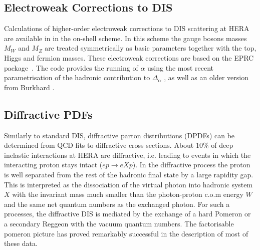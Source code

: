 \subsection{Electroweak Corrections to DIS}
Calculations of higher-order electroweak corrections to DIS scattering at 
HERA are available in \fitter in the on-shell scheme. In this scheme the
gauge bosons masses $M_W$ and 
$M_Z$ are treated symmetrically as basic parameters together with the top, 
Higgs and fermion masses.
These electroweak corrections 
are based on the EPRC package~\cite{SpiesbergerPrivComm}.
The code provides the running of $\alpha$ using the most recent parametrisation
of the hadronic contribution to $\Delta_\alpha$ \cite{Jegerlehner}, as well as 
an older version from Burkhard \cite{Burkhard}.



\subsection{Diffractive PDFs}

\newcommand{\asotp}{\ensuremath{\frac{\alpha_{\rm s}}{2\pi}}}
\newcommand{\Sgl}[1]{\ensuremath{\tilde f_{#1+}}}
\newcommand{\Pom}{{I\!P}}
\newcommand{\Reg}{{I\!R}}
\newcommand{\xpom}{$x_{I\!P}$}


Similarly to standard DIS, diffractive parton distributions (DPDFs) 
can be determined from QCD fits to diffractive cross sections.
About 10\% of deep inelastic interactions at HERA are diffractive, i.e. leading to
events in which the interacting proton stays intact ($ep\to eXp$). 
In the diffractive process the proton is well separated from the 
rest of the hadronic final state by a large rapidity gap.  
This is interpreted as the dissociation of the virtual photon into
hadronic system $X$ with the invariant mass much 
smaller than the photon-proton c.o.m energy $W$ and the same net 
quantum numbers as the exchanged photon.
For such a processes, the 
diffractive DIS is mediated by the exchange of a hard Pomeron 
or a secondary Reggeon with the vacuum quantum numbers. 
The factorisable pomeron picture has proved remarkably successful in the description of most of these data.
%

